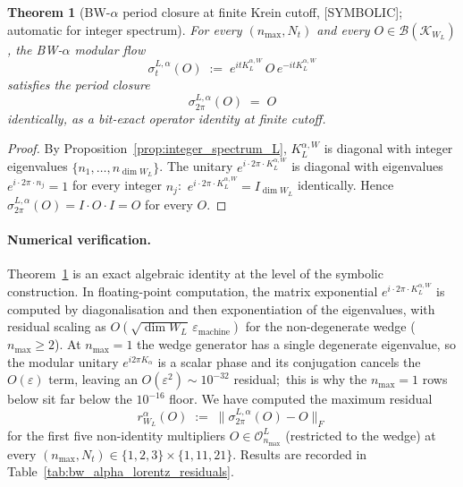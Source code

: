 \documentclass[11pt,a4paper]{article}
\theoremstyle{plain}
\newtheorem{theorem}{Theorem}[section]
\theoremstyle{definition}
\newcommand{\nmax}{n_{\max}}
\newcommand{\Nt}{N_t}
\newcommand{\Krein}{\mathcal{K}}
\newcommand{\Op}{\mathcal{O}}
\newcommand{\Bcal}{\mathcal{B}}
\newcommand{\Frob}[1]{\lVert #1 \rVert_{F}}
\newcommand{\KL}{K_{L}}
\begin{document}
\begin{theorem}[BW-$\alpha$ period closure at finite Krein cutoff,
{[SYMBOLIC]}; automatic for integer spectrum]
\label{thm:bw_alpha_lorentz}
For every $(\nmax, \Nt)$ and every $O \in \Bcal(\Krein_{W_L})$, the
BW-$\alpha$ modular flow
\begin{equation}\label{eq:bw_alpha_flow}
   \sigma_t^{L, \alpha}(O)
   \;:=\; e^{i t \KL^{\alpha, W}}\, O\, e^{-i t \KL^{\alpha, W}}
\end{equation}
satisfies the period closure
\begin{equation}\label{eq:bw_alpha_closure_lorentz}
   \sigma_{2\pi}^{L, \alpha}(O) \;=\; O
\end{equation}
identically, as a bit-exact operator identity at finite cutoff.
\end{theorem}

\begin{proof}
By Proposition~\ref{prop:integer_spectrum_L}, $\KL^{\alpha, W}$ is
diagonal with integer eigenvalues $\{n_1, \ldots, n_{\dim W_L}\}$. The
unitary $e^{i \cdot 2\pi \cdot \KL^{\alpha, W}}$ is diagonal with
eigenvalues $e^{i \cdot 2\pi \cdot n_j} = 1$ for every integer $n_j$:\
$e^{i \cdot 2\pi \cdot \KL^{\alpha, W}} = I_{\dim W_L}$ identically.
Hence $\sigma_{2\pi}^{L, \alpha}(O) = I \cdot O \cdot I = O$ for every
$O$.
\end{proof}

\paragraph{Numerical verification.}
Theorem~\ref{thm:bw_alpha_lorentz} is an exact algebraic identity at
the level of the symbolic construction. In floating-point computation,
the matrix exponential $e^{i \cdot 2\pi \cdot \KL^{\alpha, W}}$ is
computed by diagonalisation and then exponentiation of the
eigenvalues, with residual scaling as $O(\sqrt{\dim W_L}\,
\varepsilon_{\mathrm{machine}})$ for the non-degenerate wedge
($n_{\max}\ge 2$).  At $n_{\max}=1$ the wedge generator has a single
degenerate eigenvalue, so the modular unitary $e^{i2\pi K_\alpha}$ is a
scalar phase and its conjugation cancels the $O(\varepsilon)$ term,
leaving an $O(\varepsilon^{2})\sim10^{-32}$ residual;\ this is why the
$n_{\max}=1$ rows below sit far below the $10^{-16}$ floor.  We have
computed the maximum
residual
\begin{equation}\label{eq:r_L_alpha}
   r_{W_L}^\alpha(O)
   \;:=\; \Frob{\sigma_{2\pi}^{L, \alpha}(O) - O}
\end{equation}
for the first five non-identity multipliers $O \in \Op_{\nmax}^L$
(restricted to the wedge) at every $(\nmax, \Nt) \in \{1, 2, 3\}
\times \{1, 11, 21\}$. Results are recorded in
Table~\ref{tab:bw_alpha_lorentz_residuals}.
\end{document}
